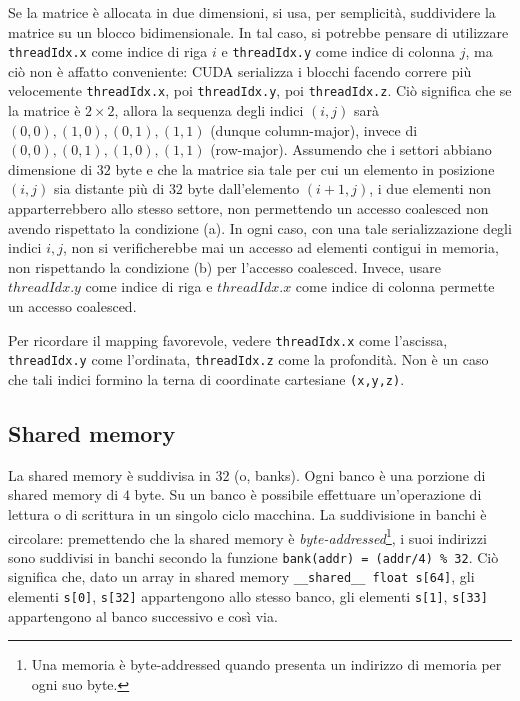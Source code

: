Se la matrice è allocata in due dimensioni, si usa, per semplicità, suddividere la matrice su un blocco bidimensionale. 
In tal caso, si potrebbe pensare di utilizzare \texttt{threadIdx.x} come indice di riga \(i\) e \texttt{threadIdx.y} come indice di colonna \(j\), ma ciò non è affatto conveniente: CUDA serializza i blocchi facendo correre più velocemente \texttt{threadIdx.x}, poi \texttt{threadIdx.y}, poi \texttt{threadIdx.z}. 
Ciò significa che se la matrice è \(2\times 2\), allora la sequenza degli indici \((i,j)\) sarà \((0,0),(1,0),(0,1),(1,1)\) (dunque column-major), invece di \((0,0),(0,1),(1,0),(1,1)\) (row-major).
Assumendo che i settori abbiano dimensione di \(32\) byte e che la matrice sia tale per cui un elemento in posizione \((i,j)\) sia distante più di \(32\) byte dall'elemento \((i+1,j)\), i due elementi non apparterrebbero allo stesso settore, non permettendo un accesso coalesced non avendo rispettato la condizione (a).
In ogni caso, con una tale serializzazione degli indici \(i,j\), non si verificherebbe mai un accesso ad elementi contigui in memoria, non rispettando la condizione (b) per l'accesso coalesced.
Invece, usare \(threadIdx.y\) come indice di riga e \(threadIdx.x\) come indice di colonna permette un accesso coalesced.

\begin{note}{}
    Per ricordare il mapping favorevole, vedere \texttt{threadIdx.x} come l'ascissa, \texttt{threadIdx.y} come l'ordinata, \texttt{threadIdx.z} come la profondità. 
    Non è un caso che tali indici formino la terna di coordinate cartesiane \texttt{(x,y,z)}.
\end{note}

\subsection{Shared memory}
La shared memory è suddivisa in \(32\)  (o, banks).
Ogni banco è una porzione di shared memory di \(4\) byte.
Su un banco è possibile effettuare un'operazione di lettura o di scrittura in un singolo ciclo macchina.
La suddivisione in banchi è circolare: premettendo che la shared memory è \textit{byte-addressed}\footnote{Una memoria è byte-addressed quando presenta un indirizzo di memoria per ogni suo byte.}, i suoi indirizzi sono suddivisi in banchi secondo la funzione \texttt{bank(addr) = (addr/4) \% 32}.
Ciò significa che, dato un array in shared memory \texttt{\_\_shared\_\_ float s[64]}, gli elementi \texttt{s[0]}, \texttt{s[32]} appartengono allo stesso banco, gli elementi \texttt{s[1]}, \texttt{s[33]} appartengono al banco successivo e così via.

